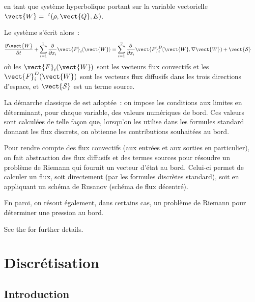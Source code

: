 en tant que système hyperbolique portant sur la variable vectorielle
$\vect{W}=\ ^t(\rho,\vect{Q},E)$.

Le système s'écrit alors~:
\begin{equation}\label{Cfbl_Cfxtcl_eq_hyperbolique_cfxtcl}
\displaystyle\frac{\partial \vect{W}}{\partial t}
+ \displaystyle\sum\limits_{i=1}^3
\frac{\partial}{\partial x_i}\vect{F}_i(\vect{W})
= \displaystyle\sum\limits_{i=1}^3
\frac{\partial}{\partial x_i}\vect{F}_i^D(\vect{W},\nabla \vect{W})
+ \vect{\mathcal{S}}
\end{equation}
où les $\vect{F}_i(\vect{W})$ sont les vecteurs flux convectifs
et les $\vect{F}_i^D(\vect{W})$ sont les vecteurs flux diffusifs
dans les trois directions d'espace,
et $\vect{\mathcal{S}}$ est un terme source.

La démarche classique de \CS est adoptée~: on impose les conditions
aux limites en déterminant, pour chaque variable, des valeurs numériques
de bord. Ces valeurs sont calculées de telle façon que, lorsqu'on
les utilise dans les formules standard donnant les flux discrets, on obtienne
les contributions souhaitées au bord.

Pour rendre compte des flux convectifs (aux entrées et aux sorties en particulier),
on fait abstraction des flux diffusifs et des termes
sources pour résoudre un problème de Riemann qui
fournit un vecteur d'état au bord. Celui-ci permet de calculer un flux,
soit directement (par les formules discrètes standard),
soit en appliquant un schéma de Rusanov (schéma de flux décentré).

En paroi, on résout  également, dans certains cas, un problème de
Riemann pour déterminer une pression au bord.

See the  for further details.

\section*{Discrétisation}

\subsection*{Introduction}

